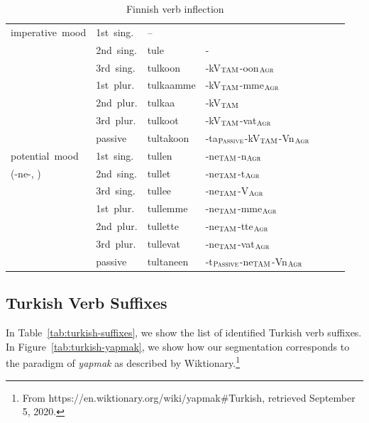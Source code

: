 \documentclass[11pt,letterpaper]{article}
\begin{document}
\begin{table}
\begin{tabular}{l|llllll}
	imperative mood  &1st sing. &	-- \\ 
	 \cite[Section 66]{karlsson1999finnish}	 & 2nd sing. &	tule & - \\ 
	&	3rd sing. &	tulkoon  & -kV$_{\textsc{TAM}}$-oon$_{\textsc{Agr}}$\\ 
	&	1st plur. &	tulkaamme  & -kV$_{\textsc{TAM}}$-mme$_{\textsc{Agr}}$\\ 
	&	2nd plur. &	tulkaa   & -kV$_{\textsc{TAM}}$\\ 
	&	3rd plur. 	&tulkoot  & -kV$_{\textsc{TAM}}$-vat$_{\textsc{Agr}}$\\ 
	&	passive 	&tultakoon  & -ta$_{\textsc{Passive}}$-kV$_{\textsc{TAM}}$-Vn$_{\textsc{Agr}}$\\ \hline
	potential mood 	 &	1st sing. &	tullen  & -ne$_{\textsc{TAM}}$-n$_{\textsc{Agr}}$\\ 
		(-ne-, \cite[Section 67]{karlsson1999finnish}) & 2nd sing. &	tullet  & -ne$_{\textsc{TAM}}$-t$_{\textsc{Agr}}$\\ 
	&	3rd sing. &	tullee  & -ne$_{\textsc{TAM}}$-V$_{\textsc{Agr}}$\\ 
	&	1st plur. &	tullemme  & -ne$_{\textsc{TAM}}$-mme$_{\textsc{Agr}}$\\ 
	&	2nd plur. &	tullette  & -ne$_{\textsc{TAM}}$-tte$_{\textsc{Agr}}$\\ 
	&	3rd plur. &	tullevat  & -ne$_{\textsc{TAM}}$-vat$_{\textsc{Agr}}$\\ 
	&	passive &	tultaneen  & -t$_{\textsc{Passive}}$-ne$_{\textsc{TAM}}$-Vn$_{\textsc{Agr}}$ \\ \hline
\end{tabular}
	\caption{Finnish verb inflection}\label{tab:finnish}
\end{table}

\subsection{Turkish Verb Suffixes}

In Table~\ref{tab:turkish-suffixes}, we show the list of identified Turkish verb suffixes.
In Figure~\ref{tab:turkish-yapmak}, we show how our segmentation corresponds to the paradigm of \textit{yapmak} as described by Wiktionary.\footnote{From https://en.wiktionary.org/wiki/yapmak\#Turkish, retrieved September 5, 2020.}
\end{document}
